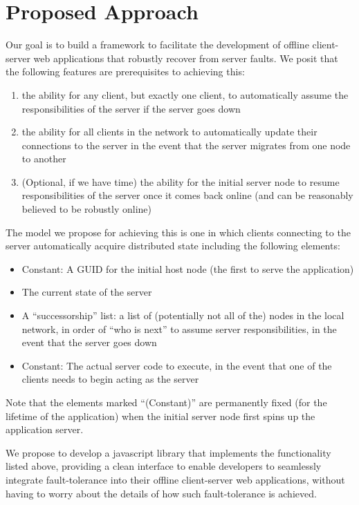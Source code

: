 \section{Proposed Approach}
\label{sec:approach}

Our goal is to build a framework to facilitate the development of offline client-server web applications that robustly recover from server faults. 
We posit that the following features are prerequisites to achieving this:

\begin{enumerate}
	\item the ability for any client, but exactly one client, to automatically assume the responsibilities of the server if the server goes down
    \item the ability for all clients in the network to automatically update their connections to the server in the event that the server migrates from one node to another
    \item (Optional, if we have time) the ability for the initial server node to resume responsibilities of the server once it comes back online (and can be reasonably believed to be robustly online)
\end{enumerate}

The model we propose for achieving this is one in which clients connecting to the server automatically acquire distributed state including the following elements:

\begin{itemize}
	\item Constant: A GUID for the initial host node (the first to serve the application)
    \item The current state of the server
	\item A ``successorship'' list: a list of (potentially not all of the) nodes in the local network, in order of ``who is next'' to assume server responsibilities, in the event that the server goes down
    \item Constant: The actual server code to execute, in the event that one of the clients needs to begin acting as the server
\end{itemize}

Note that the elements marked ``(Constant)'' are permanently fixed (for the lifetime of the application) when the initial server node first spins up the application server.

We propose to develop a javascript library that implements the functionality listed above, providing a clean interface to enable developers to seamlessly integrate fault-tolerance into their offline client-server web applications, without having to worry about the details of how such fault-tolerance is achieved.

